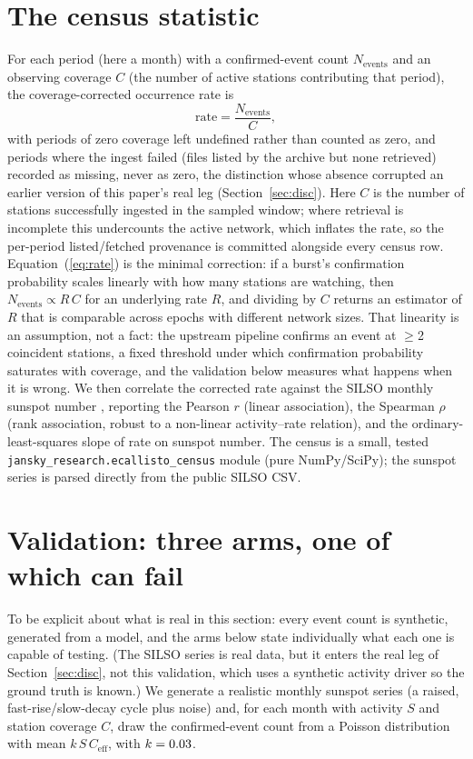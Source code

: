 \documentclass[twocolumn]{aastex631}
\newcommand{\code}[1]{\texttt{#1}}
\begin{document}
\section{The census statistic}
For each period (here a month) with a confirmed-event count $N_\mathrm{events}$ and an observing
coverage $C$ (the number of active stations contributing that period), the coverage-corrected
occurrence rate is
\begin{equation}
\mathrm{rate} = \frac{N_\mathrm{events}}{C},
\label{eq:rate}
\end{equation}
with periods of zero coverage left undefined rather than counted as zero, and periods where the
ingest failed (files listed by the archive but none retrieved) recorded as missing, never as zero,
the distinction whose absence corrupted an earlier version of this paper's real leg
(Section~\ref{sec:disc}). Here $C$ is the number of stations successfully
ingested in the sampled window; where retrieval is incomplete this undercounts the active network,
which inflates the rate, so the per-period listed/fetched provenance is committed alongside every
census row. Equation~(\ref{eq:rate}) is
the minimal correction: if a burst's confirmation probability scales linearly with how many
stations are watching, then $N_\mathrm{events}\propto R\,C$ for an underlying rate $R$, and
dividing by $C$ returns an estimator of $R$ that is comparable across epochs with different network
sizes. That linearity is an assumption, not a fact: the upstream pipeline confirms an event at
$\geq$2 coincident stations, a fixed threshold under which confirmation probability
saturates with coverage, and the validation below measures what happens when it is
wrong. We then correlate
the corrected rate against the SILSO monthly sunspot number \citep{clette2014,silso2015}, reporting the
Pearson $r$ (linear association), the Spearman $\rho$ (rank association, robust to a non-linear
activity--rate relation), and the ordinary-least-squares slope of rate on sunspot number. The census
is a small, tested \code{jansky\_research.ecallisto\_census} module (pure NumPy/SciPy); the sunspot
series is parsed directly from the public SILSO CSV.

\section{Validation: three arms, one of which can fail}
To be explicit about what is real in this section: every event count is synthetic, generated from a
model, and the arms below state individually what each one is capable of testing. (The SILSO series
is real data, but it enters the real leg of Section~\ref{sec:disc}, not this validation,
which uses a synthetic activity driver so the ground truth is known.) We generate a realistic
monthly sunspot series (a raised, fast-rise/slow-decay cycle plus noise) and, for each month
with activity $S$ and station coverage $C$, draw the confirmed-event count from a Poisson
distribution with mean $k\,S\,C_\mathrm{eff}$, with $k=0.03$.
\end{document}
